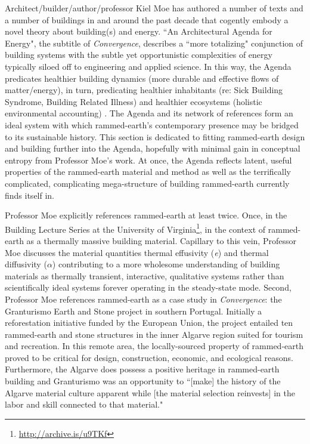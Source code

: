 
Architect/builder/author/professor Kiel Moe has authored a number of texts and a number of buildings in and around the past decade that cogently embody a novel theory about building(s) and energy. ``An Architectural Agenda for Energy", the subtitle of \textit{Convergence}, describes a ``more totalizing" conjunction of building systems with the subtle yet opportunistic complexities of energy typically siloed off to engineering and applied science. In this way, the Agenda predicates healthier building dynamics (more durable and effective flows of matter/energy), in turn, predicating healthier inhabitants (re: Sick Building Syndrome, Building Related Illness) and healthier ecosystems (holistic environmental accounting) \cite{MOECONVERGENCE}. The Agenda and its network of references form an ideal system with which rammed-earth's contemporary presence may be bridged to its sustainable history. This section is dedicated to fitting rammed-earth design and building further into the Agenda, hopefully with minimal gain in conceptual entropy from Professor Moe's work. At once, the Agenda reflects latent, useful properties of the rammed-earth material and method as well as the terrifically complicated, complicating mega-structure of building rammed-earth currently finds itself in.

Professor Moe explicitly references rammed-earth at least twice. Once, in the Building Lecture Series at the University of Virginia\footnote{\url{http://archive.is/u9TKf}}, in the context of rammed-earth as a thermally massive building material. Capillary to this vein, Professor Moe discusses the material quantities thermal effusivity (\textit{e}) and thermal diffusivity ($\alpha$) contributing to a more wholesome understanding of building materials as thermally transient, interactive, qualitative systems rather than scientifically ideal systems forever operating in the steady-state mode. Second, Professor Moe references rammed-earth as a case study in \textit{Convergence}: the Granturismo Earth and Stone project in southern Portugal. Initially a reforestation initiative funded by the European Union, the project entailed ten rammed-earth and stone structures in the inner Algarve region suited for tourism and recreation. In this remote area, the locally-sourced property of rammed-earth proved to be critical for design, construction, economic, and ecological reasons. Furthermore, the Algarve does possess a positive heritage in rammed-earth building and Granturismo was an opportunity to ``[make] the history of the Algarve material culture apparent while [the material selection reinvests] in the labor and skill connected to that material." \cite{MOECONVERGENCE}

